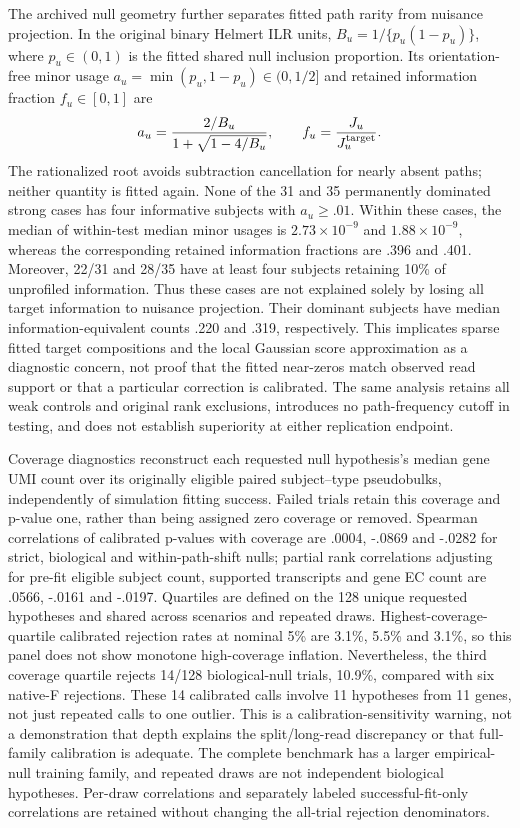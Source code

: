 \documentclass[11pt]{article}
\begin{document}
The archived null geometry further separates fitted path rarity from nuisance projection. In the original binary Helmert ILR units, \(B_u=1/\{p_u(1-p_u)\}\), where \(p_u\in(0,1)\) is the fitted shared null inclusion proportion. Its orientation-free minor usage \(a_u=\min(p_u,1-p_u)\in(0,1/2]\) and retained information fraction \(f_u\in[0,1]\) are \begin{equation}a_u=\frac{2/B_u}{1+\sqrt{1-4/B_u}},\qquad f_u=\frac{J_u}{J_u^{\rm target}}.\end{equation} The rationalized root avoids subtraction cancellation for nearly absent paths; neither quantity is fitted again. None of the 31 and 35 permanently dominated strong cases has four informative subjects with \(a_u\ge.01\). Within these cases, the median of within-test median minor usages is \(2.73\times10^{-9}\) and \(1.88\times10^{-9}\), whereas the corresponding retained information fractions are .396 and .401. Moreover, 22/31 and 28/35 have at least four subjects retaining 10\% of unprofiled information. Thus these cases are not explained solely by losing all target information to nuisance projection. Their dominant subjects have median information-equivalent counts .220 and .319, respectively. This implicates sparse fitted target compositions and the local Gaussian score approximation as a diagnostic concern, not proof that the fitted near-zeros match observed read support or that a particular correction is calibrated. The same analysis retains all weak controls and original rank exclusions, introduces no path-frequency cutoff in testing, and does not establish superiority at either replication endpoint.

Coverage diagnostics reconstruct each requested null hypothesis's median gene UMI count over its originally eligible paired subject--type pseudobulks, independently of simulation fitting success. Failed trials retain this coverage and p-value one, rather than being assigned zero coverage or removed. Spearman correlations of calibrated p-values with coverage are .0004, -.0869 and -.0282 for strict, biological and within-path-shift nulls; partial rank correlations adjusting for pre-fit eligible subject count, supported transcripts and gene EC count are .0566, -.0161 and -.0197. Quartiles are defined on the 128 unique requested hypotheses and shared across scenarios and repeated draws. Highest-coverage-quartile calibrated rejection rates at nominal 5\% are 3.1\%, 5.5\% and 3.1\%, so this panel does not show monotone high-coverage inflation. Nevertheless, the third coverage quartile rejects 14/128 biological-null trials, 10.9\%, compared with six native-F rejections. These 14 calibrated calls involve 11 hypotheses from 11 genes, not just repeated calls to one outlier. This is a calibration-sensitivity warning, not a demonstration that depth explains the split/long-read discrepancy or that full-family calibration is adequate. The complete benchmark has a larger empirical-null training family, and repeated draws are not independent biological hypotheses. Per-draw correlations and separately labeled successful-fit-only correlations are retained without changing the all-trial rejection denominators.
\end{document}
